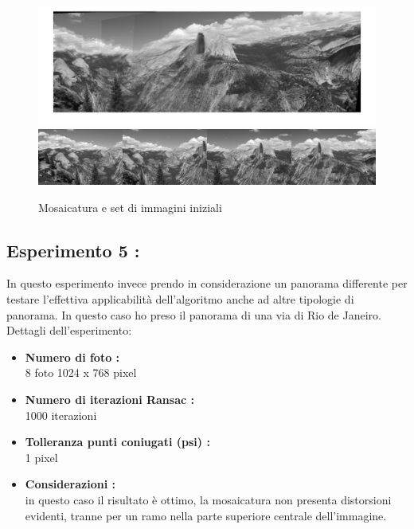 \documentclass[11pt, oneside]{article}   	%
\begin{document}
\begin{figure}[H]
\includegraphics[width=\textwidth]{montagna_psi_25.jpg}
\includegraphics[width=\textwidth]{foto_mosaico_montagna2.png}
\caption{Mosaicatura e set di immagini iniziali}
\end{figure}


\subsection{Esperimento 5 :}
In questo esperimento invece prendo in considerazione un panorama differente per testare l'effettiva applicabilità dell'algoritmo anche ad altre tipologie di panorama. In questo caso ho preso il panorama di una via di Rio de Janeiro.
Dettagli dell'esperimento:
\begin{itemize}
	\item \textbf{Numero di foto :} \\
	8 foto 1024 x 768 pixel
	\item \textbf{Numero di iterazioni Ransac : } \\
	1000 iterazioni
	\item \textbf{Tolleranza punti coniugati (psi) :}\\
        1 pixel
        \item \textbf{Considerazioni : }\\
        in questo caso il risultato è ottimo, la mosaicatura non presenta distorsioni evidenti, tranne per un ramo nella parte superiore centrale dell'immagine.
\end{itemize}
\end{document}
